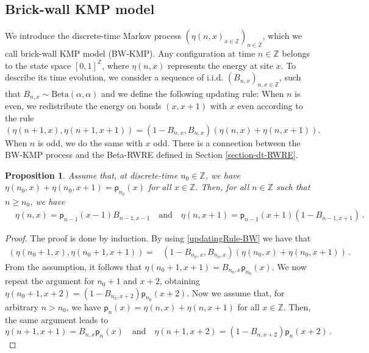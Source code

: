 \documentclass[a4paper,11pt,oneside,reqno]{amsart}
\newtheorem{proposition}[theorem]{Proposition}
\theoremstyle{definition}
\renewcommand{\geq}{\geqslant}
\numberwithin{equation}{section}
\begin{document}
\subsection{Brick-wall KMP model}\label{section-BW-def}
We introduce the discrete-time Markov process $(\eta(n,x)_{x\in\mathbb{Z}})_{n\in \mathbb{Z}}$, which we call brick-wall KMP model  (BW-KMP). Any configuration at time $n\in\mathbb{Z}$ belongs to the state space $[0,1]^{\mathbb{Z}}$, where $\eta(n,x)$ represents the energy at site $x$. To describe its time evolution, we consider a sequence of i.i.d. $(B_{n,x})_{n,x\in \mathbb{Z}}$, such that $B_{n,x}\sim \text{Beta}(\alpha,\alpha)$ and we define the following updating rule: 
When $n$ is even, we redistribute the energy on bonds $(x,x+1)$ with $x$ even according to the rule 
		\begin{equation}\label{updatingRule-BW}
	\left(\eta(n+1,x),\eta(n+1,x+1)\right)=\left(1-B_{n,x},B_{n,x}\right)\left(\eta(n,x)+\eta(n,x+1)\right).
\end{equation}
When $n$ is odd, we do the same with $x$ odd.
There is a connection between the BW-KMP process and the Beta-RWRE defined in Section \ref{section-dt-RWRE}. 
\begin{proposition}\label{proposition-connetion-BW-RWRE}
	Assume that, at discrete-time $n_{0}\in \mathbb{Z}$, we have $\eta(n_{0},x)+\eta(n_{0},x+1)=\mathsf{p}_{n_{0}}(x)$ for all $x\in\mathbb{Z}$. 
		Then, for all $n\in \mathbb{Z}$ such that $n\geq n_{0}$, we have 
		\begin{equation}\label{connection-BW-RW}
        \begin{split}
			&\eta(n,x)
			=\mathsf{p}_{n-1}(x-1)B_{n-1,x-1}\quad \text{and}\quad 
		\eta(n,x+1)
		=\mathsf{p}_{n-1}(x+1)\left(1-B_{n-1,x+1}\right)\,.
        \end{split}
		\end{equation}
	
	\end{proposition}
	 \begin{proof} The proof is done by induction. By using \eqref{updatingRule-BW} we have that 
	 	\begin{equation*}
	 		\begin{split}
	 			\left(\eta(n_{0}+1,x),\eta(n_{0}+1,x+1)\right)=&\left(1-B_{n_{0},x},B_{n_{0},x}\right)(\eta(n_{0},x)+\eta(n_{0},x+1))\,.
	 		\end{split}
	 	\end{equation*}
	 	From the assumption, it follows that $\eta(n_{0}+1,x+1)=B_{n_{0},x}\mathsf{p}_{n_{0}}(x)$. We now repeat the argument for $n_{0}+1$ and $x+2$, obtaining 
	 		$\eta(n_{0}+1,x+2)=(1-B_{n_{0},x+2})\mathsf{p}_{n_{0}}(x+2)$. Now we assume that, for arbitrary $n> n_{0}$, we have  $\mathsf{p}_{n}(x)=\eta(n,x)+\eta(n,x+1)$ for all $x\in \mathbb{Z}$. Then, the same argument leads to
	 		\begin{equation*}
\eta(n+1,x+1)=B_{n,x}\mathsf{p}_{n}(x)\quad \text{and}\quad \eta(n+1,x+2)=(1-B_{n,x+2})\mathsf{p}_{n}(x+2)\,.
	 		\end{equation*}
	\end{proof}
\end{document}
